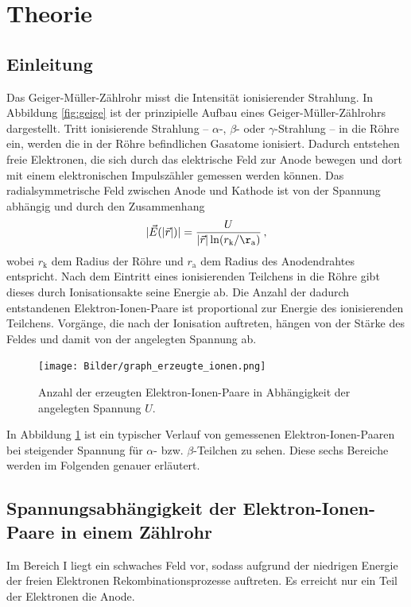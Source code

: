 \section{Theorie}
\label{sec:Theorie}

\subsection{Einleitung}
Das Geiger-Müller-Zählrohr misst die Intensität ionisierender Strahlung.
In Abbildung \ref{fig:geige} ist der prinzipielle Aufbau eines Geiger-Müller-Zählrohrs
dargestellt.
Tritt ionisierende Strahlung -- $\alpha$-, $\beta$- oder $\gamma$-Strahlung -- in die Röhre
ein, werden die in der Röhre befindlichen Gasatome ionisiert. Dadurch entstehen freie Elektronen,
die sich durch das elektrische Feld zur Anode bewegen und dort mit einem elektronischen
Impulszähler gemessen werden können.
Das radialsymmetrische Feld zwischen Anode und Kathode ist von der Spannung abhängig und durch
den Zusammenhang
\begin{equation}
	|\vec{E}(|\vec{r}|)| = \frac{U}{|\vec{r}| \ln(r_{\mathrm{k}} / \r_{\mathrm{a}})} \, \mathrm{,}
\end{equation}
wobei $r_{\mathrm{k}}$ dem Radius der Röhre und $r_{\mathrm{a}}$ dem Radius des Anodendrahtes
entspricht.
Nach dem Eintritt eines ionisierenden Teilchens in die Röhre gibt dieses durch Ionisationsakte
seine Energie ab. Die Anzahl der dadurch entstandenen Elektron-Ionen-Paare ist proportional
zur Energie des ionisierenden Teilchens.
Vorgänge, die nach der Ionisation auftreten, hängen von der Stärke des Feldes und damit von der
angelegten Spannung ab.
\begin{figure}
  \centering
  \texttt{[image: Bilder/graph\_erzeugte\_ionen.png]}
  \caption{Anzahl der erzeugten Elektron-Ionen-Paare in Abhängigkeit der angelegten Spannung $U$. \cite{Anleitung}}
  \label{fig:voltage_ions}
\end{figure}
In Abbildung \ref{fig:voltage_ions} ist ein typischer Verlauf von gemessenen
Elektron-Ionen-Paaren bei steigender Spannung für $\alpha$- bzw. $\beta$-Teilchen zu sehen.
Diese sechs Bereiche werden im Folgenden genauer erläutert.
\FloatBarrier
\subsection{Spannungsabhängigkeit der Elektron-Ionen-Paare in einem Zählrohr}
Im Bereich I liegt ein schwaches Feld vor, sodass aufgrund der niedrigen Energie der
freien Elektronen Rekombinationsprozesse auftreten. Es erreicht nur ein Teil der Elektronen
die Anode.

